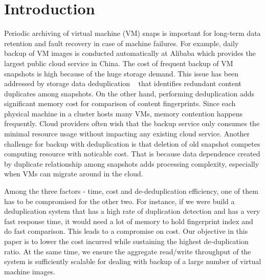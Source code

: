 \section{Introduction}



Periodic  archiving of virtual machine (VM) snaps is important 
for long-term data  retention and fault recovery in case of machine failures.  
For example, daily backup of VM images  is conducted automatically 
at Alibaba which provides the largest public cloud service in China.
The cost of frequent backup of VM snapshots is  high because of the huge storage demand.
This issue has been addressed by   storage data deduplication ~\cite{venti02,bottleneck08} that
identifies redundant content duplicates among snapshots.  On the other hand, performing
deduplication adds significant  memory cost for comparison of content fingerprints. 
Since each physical machine in a cluster  hosts many VMs, memory contention happens frequently. 
Cloud providers often wish that the backup service only consumes  the minimal resource usage without 
impacting any existing cloud service.  Another challenge for backup with deduplication is that deletion 
of old snapshot competes computing resource with noticable cost. That is because data dependence created 
by duplicate relationship among snapshots  adds processing complexity, especially when  
VMs can migrate around in the cloud. 

Among the three factors - time, cost and de-deduplication efficiency, one of them has to be compromised for the other two. For instance, if we were build a deduplication system that has a high rate of duplication detection and has a very fast response time, 
it would need a lot of memory to hold fingerprint index and do fast comparison.  This leads to a compromise on cost. 
Our objective in this paper is to lower the cost incurred while sustaining the highest de-duplication ratio. 
At the same time, we ensure the aggregate read/write throughput of the system 
is sufficiently scalable  for dealing with backup of a large number of virtual machine images. 


